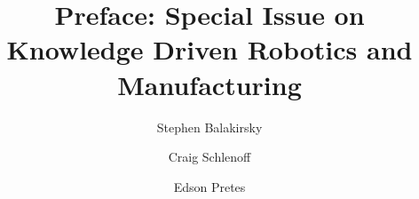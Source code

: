 \documentclass[review]{elsarticle}
\begin{document}
\begin{frontmatter}

\title{Preface: Special Issue on Knowledge Driven Robotics and Manufacturing}

\author{Stephen Balakirsky}
\address{Georgia Tech Research Institute, Atlanta, GA 30332, USA}

\author{Craig Schlenoff}
\address{National Institute of Standards and Technology, Gaithersburg, MD 20899, USA}

\author{Edson Pretes}
\address{Universidade Federal do Rio Grande do Sol, Porto Alegre, Rio Grande do Sul, Brazil}

\end{frontmatter}

\linenumbers

%
%
%
%



%
%



%
%
%
%
\end{document}
